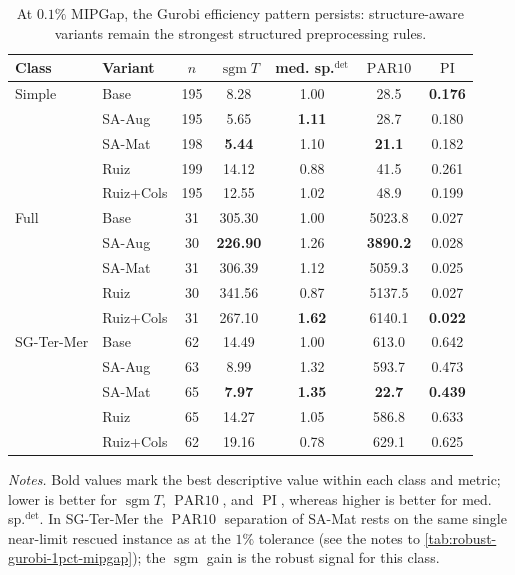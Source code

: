 \documentclass[AMA,Times1COL]{WileyNJDv5} %
\newcommand{\methodBase}{Base}
\newcommand{\methodAug}{SA-Aug}
\newcommand{\methodMat}{SA-Mat}
\newcommand{\methodRuiz}{Ruiz}
\newcommand{\methodRuizCols}{Ruiz+Cols}
\newcommand{\sgm}{\ensuremath{\operatorname{sgm}}}
\newcommand{\PARten}{\ensuremath{\operatorname{PAR10}}}
\newcommand{\PI}{\ensuremath{\operatorname{PI}}}
\providecommand{\DIFaddbegin}{} %
\providecommand{\DIFaddend}{} %
\providecommand{\DIFdelend}{} %
\begin{document}
\DIFdelend \DIFaddbegin \begin{table}[t]
\centering
\footnotesize
\caption{At $0.1\%$ MIPGap, the Gurobi efficiency pattern persists: structure-aware variants remain the strongest structured preprocessing rules.}
\label{tab:robust-gurobi-01pct-mipgap}
\begin{tabular}{@{}ll S[table-format=3.0] S[table-format=3.2] S[table-format=1.2] S[table-format=4.1] S[table-format=1.3] @{}}
\toprule
Class & Variant & {$n$} & {$\sgm T$} & {med. sp.$^{\det}$} & {\PARten{}} & {\PI{}} \\
\midrule
Simple & \methodBase & 195 & 8.28 & 1.00 & 28.5 & \textbf{0.176} \\
 & \methodAug & 195 & 5.65 & \textbf{1.11} & 28.7 & 0.180 \\
 & \methodMat & 198 & \textbf{5.44} & 1.10 & \textbf{21.1} & 0.182 \\
 & \methodRuiz & 199 & 14.12 & 0.88 & 41.5 & 0.261 \\
 & \methodRuizCols & 195 & 12.55 & 1.02 & 48.9 & 0.199 \\
\addlinespace
Full & \methodBase & 31 & 305.30 & 1.00 & 5023.8 & 0.027 \\
 & \methodAug & 30 & \textbf{226.90} & 1.26 & \textbf{3890.2} & 0.028 \\
 & \methodMat & 31 & 306.39 & 1.12 & 5059.3 & 0.025 \\
 & \methodRuiz & 30 & 341.56 & 0.87 & 5137.5 & 0.027 \\
 & \methodRuizCols & 31 & 267.10 & \textbf{1.62} & 6140.1 & \textbf{0.022} \\
\addlinespace
SG-Ter-Mer & \methodBase & 62 & 14.49 & 1.00 & 613.0 & 0.642 \\
 & \methodAug & 63 & 8.99 & 1.32 & 593.7 & 0.473 \\
 & \methodMat & 65 & \textbf{7.97} & \textbf{1.35} & \textbf{22.7} & \textbf{0.439} \\
 & \methodRuiz & 65 & 14.27 & 1.05 & 586.8 & 0.633 \\
 & \methodRuizCols & 62 & 19.16 & 0.78 & 629.1 & 0.625 \\
\bottomrule
\end{tabular}
\begin{flushleft}\footnotesize
\emph{Notes.} Bold values mark the best descriptive value within each class and metric;
lower is better for $\sgm T$, \PARten{}, and \PI{}, whereas higher is better
for med. sp.$^{\det}$. In SG-Ter-Mer the \PARten{} separation of \methodMat{} rests on the
same single near-limit rescued instance as at the $1\%$ tolerance (see the notes to
\cref{tab:robust-gurobi-1pct-mipgap}); the $\sgm$ gain is the robust signal for this class.
\end{flushleft}
\end{table}
\DIFaddend 
\end{document}
